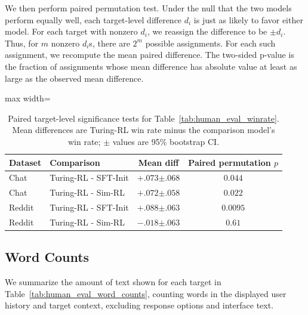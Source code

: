 \documentclass[11pt]{article}
\newcommand{\subtle}[1]{{\tiny\color[gray]{0.4}#1}}
\begin{document}
We then perform paired permutation test. Under the null that the two models perform equally well, each target-level difference $d_i$ is just as likely to favor either model. For each target with nonzero $d_i$, we reassign the difference to be $\pm d_i$. Thus, for $m$ nonzero $d_i$s, there are $2^m$ possible assignments. For each such assignment, we recompute the mean paired difference. The two-sided p-value is the fraction of assignments whose mean difference has absolute value at least as large as the observed mean difference.

\begin{table}[t]
\centering
\small
\setlength{\tabcolsep}{3.5pt}
\begin{adjustbox}{max width=\linewidth}
\begin{tabular}{@{}llcc@{}}
\toprule
Dataset & Comparison & Mean diff & Paired permutation $p$ \\
\midrule
Chat & Turing-RL - SFT-Init & $+.073$\subtle{$\pm .068$} & $0.044$ \\
Chat & Turing-RL - Sim-RL & $+.072$\subtle{$\pm .058$} & $0.022$ \\
Reddit & Turing-RL - SFT-Init & $+.088$\subtle{$\pm .063$} & $0.0095$ \\
Reddit & Turing-RL - Sim-RL & $-.018$\subtle{$\pm .063$} & $0.61$ \\
\bottomrule
\end{tabular}
\end{adjustbox}
\caption{Paired target-level significance tests for Table~\ref{tab:human_eval_winrate}. Mean differences are Turing-RL win rate minus the comparison model's win rate; $\pm$ values are 95\% bootstrap CI.}
\label{tab:human_eval_significance}
\end{table}

\subsection{Word Counts}
We summarize the amount of text shown for each target in Table~\ref{tab:human_eval_word_counts}, counting words in the displayed user history and target context, excluding response options and interface text.
\end{document}
